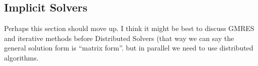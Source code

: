 \documentclass{report}
\begin{document}



\subsection{Implicit Solvers}

Perhaps this section should move up. I think it might be best to discuss GMRES and iterative methods before Distributed Solvers (that way we can say the general solution form is ``matrix form''. but in parallel we need to use distributed algorithms.



\ifstandalone


\end{document}
